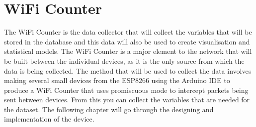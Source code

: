 \documentclass{report}
\begin{document}
\clearpage
\section{WiFi Counter}
The WiFi Counter is the data collector that will collect the variables that will be stored in the database and this data will also be used to create visualisation and statistical models. The WiFi Counter is a major element to the network that will be built between the individual devices, as it is the only source from which the data is being collected. The method that will be used to collect the data involves making several small devices from the ESP8266 using the Arduino IDE\cite{ArdinoIDE} to produce a WiFi Counter that uses promiscuous mode to intercept packets being sent between devices. From this you can collect the variables that are needed for the dataset. The following chapter will go through the designing and implementation of the device.
\end{document}

